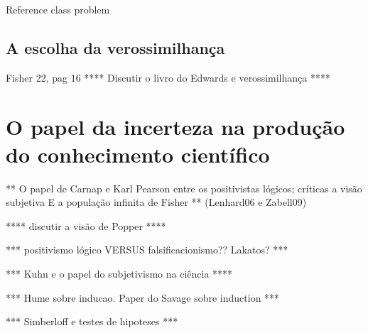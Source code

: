 \documentclass[12pt,a4paper]{article}
\begin{document}
Reference class problem

\subsection{A escolha da verossimilhança}
Fisher 22, pag 16
**** Discutir o livro do Edwards e verossimilhança ****


\section{O papel da incerteza na produção do conhecimento científico}

** O papel de Carnap e Karl Pearson entre os positivistas lógicos; críticas a visão subjetiva E a população infinita de Fisher **
(Lenhard06 e Zabell09)

**** discutir a visão de Popper ****

*** positivismo lógico VERSUS falsificacionismo?? Lakatos? ***

*** Kuhn e o papel do subjetivismo na ciência ****

*** Hume sobre inducao. Paper do Savage sobre induction ***

*** Simberloff e testes de hipoteses ***



\end{document}

